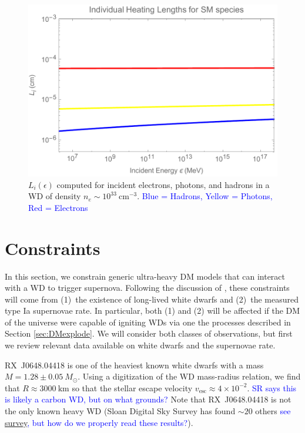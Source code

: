 \documentclass[twocolumn,showpacs,preprintnumbers,amsmath,amssymb,prd]{revtex4}
\begin{document}
\begin{figure}
\includegraphics[scale=.45]{cashmoney.pdf}
\caption{$L_i (\epsilon)$ computed for incident electrons, photons, and hadrons in a WD of density $n_e \sim 10^{33} ~\text{cm}^{-3}$. \textcolor{blue}{Blue = Hadrons, Yellow = Photons, Red = Electrons}}
\label{fig:cash}
\end{figure}


\section{Constraints}
\label{sec:Constraints}

In this section, we constrain generic ultra-heavy DM models that can interact with a WD to trigger supernova. Following the discussion of \cite{Graham:2015apa}, these constraints will come from (1)~the existence of long-lived white dwarfs and (2)~the measured type Ia supernovae rate. In particular, both (1) and (2) will be affected if the DM of the universe were capable of igniting WDs via one the processes described in Section \ref{sec:DMexplode}. We will consider both classes of observations, but first we review relevant data available on white dwarfs and the supernovae rate.

RX~J0648.04418 is one of the heaviest known white dwarfs with a mass $M = 1.28\pm 0.05 ~M_{\odot}$. Using a digitization of the WD mass-radius relation, we find that $R \approx 3000~\text{km}$ so that the stellar escape velocity $v_\text{esc} \approx 4 \times 10^{-2}$. \textcolor{blue}{SR says this is likely a carbon WD, but on what grounds?} Note that RX~J0648.04418 is not the only known heavy WD (Sloan Digital Sky Survey has found $\sim 20$ others \textcolor{blue}{see \href{https://heasarc.gsfc.nasa.gov/db-perl/W3Browse/w3hdprods.pl}{survey}, but how do we properly read these results?}).
\end{document}
